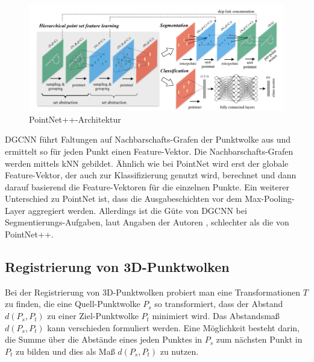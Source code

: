 \documentclass[12pt,titlepage, twoside]{article}
\begin{document}
\begin{figure}
    \centering
    \includegraphics[width=1.0\textwidth]{./Images/PointNetPPArchitektur.png}
    \caption{PointNet++-Architektur \cite{qi2017pointnet++}}
    \label{fig:point:net:pp:arch}
\end{figure}

DGCNN führt Faltungen auf Nachbarschafts-Grafen der Punktwolke aus und ermittelt so für jeden Punkt einen Feature-Vektor. Die Nachbarschafts-Grafen werden mittels kNN gebildet.
Ähnlich wie bei PointNet wird erst der globale Feature-Vektor, der auch zur Klassifizierung genutzt wird, berechnet und dann darauf basierend die Feature-Vektoren für die einzelnen Punkte.
Ein weiterer Unterschied zu PointNet ist, dass die Ausgabeschichten vor dem Max-Pooling-Layer aggregiert werden.
Allerdings ist die Güte von DGCNN bei Segmentierungs-Aufgaben, laut Angaben der Autoren \cite{dgcnn}, schlechter als die von PointNet++.

\subsection{Registrierung von 3D-Punktwolken}
\label{sec:stand:registrierung}

Bei der Registrierung von 3D-Punktwolken probiert man eine Transformationen $T$ zu finden, die eine Quell-Punktwolke $P_s$ so transformiert, dass der Abstand $d(P_s,P_t)$ zu einer Ziel-Punktwolke $P_t$ minimiert wird.
Das Abstandsmaß $d(P_s, P_t)$ kann verschieden formuliert werden. Eine Möglichkeit besteht darin, die Summe über die Abstände eines jeden Punktes in $P_s$ 
zum nächsten Punkt in $P_t$ zu bilden und dies als Maß $d(P_s, P_t)$ zu nutzen. 
\end{document}
